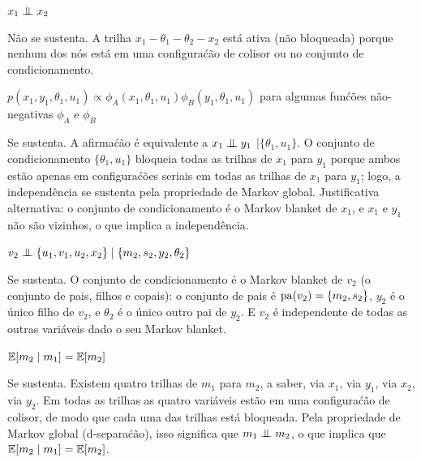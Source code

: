 \begin{exenumerate}
    \item $x_1 \mathrel{\perp\mspace{-10mu}\perp} x_2$
    
    \begin{solution}
        N\~ao se sustenta. A trilha $x_1 - \theta_1 - \theta_2 - x_2$ est\'a
        ativa (n\~ao bloqueada) porque nenhum dos n\'os est\'a em uma configura\'c\~ao
        de colisor ou no conjunto de condicionamento.
    \end{solution}
    
    \item $p(x_1, y_1, \theta_1, u_1) \propto \phi_A(x_1, \theta_1, u_1)\phi_B(y_1, \theta_1, u_1)$ para algumas fun\'c\~oes n\~ao-negativas $\phi_A$ e $\phi_B$ 
    
    \begin{solution}
        Se sustenta. A afirma\'c\~ao \'e equivalente a $x_1 \mathrel{\perp\mspace{-10mu}\perp} y_1$
        $\mid \{\theta_1, u_1\}$. O conjunto de condicionamento $\{\theta_1,
        u_1\}$ bloqueia todas as trilhas de $x_1$ para $y_1$ porque ambos
        est\~ao apenas em configura\'c\~oes seriais em todas as trilhas de $x_1$ para
        $y_1$; logo, a independ\^encia se sustenta pela propriedade de Markov
        global. Justificativa alternativa: o conjunto de condicionamento \'e
        o Markov blanket de $x_1$, e $x_1$ e $y_1$ n\~ao s\~ao
        vizinhos, o que implica a independ\^encia.
    \end{solution}
    
    \item $v_2 \mathrel{\perp\mspace{-10mu}\perp} \{u_1, v_1, u_2, x_2\} \mid \{m_2, s_2, y_2, \theta_2\}$
    
    \begin{solution}
        Se sustenta. O conjunto de condicionamento \'e o Markov blanket de $v_2$
        (o conjunto de pais, filhos e copais): o conjunto de
        pais \'e $\mathrm{pa}(v_2)=\{m_2, s_2\}$, $y_2$ \'e o \'unico filho de
        $v_2$, e $\theta_2$ \'e o \'unico outro pai de
        $y_2$. E $v_2$ \'e independente de todas as outras vari\'aveis
        dado o seu Markov blanket.
    \end{solution}
    
    \item $\mathbb{E} [ m_2 \mid  m_1 ] = \mathbb{E}[m_2]$
    
    \begin{solution}
        Se sustenta. Existem quatro trilhas de $m_1$ para $m_2$, a saber, via
        $x_1$, via $y_1$, via $x_2$, via $y_2$. Em todas as trilhas as quatro
        vari\'aveis est\~ao em uma configura\'c\~ao de colisor, de modo que cada uma das
        trilhas est\'a bloqueada. Pela propriedade de Markov global
        (d-separa\'c\~ao), isso significa que $m_1 \mathrel{\perp\mspace{-10mu}\perp} m_2$, o que
        implica que $\mathbb{E}[m_2 \mid m_1] = \mathbb{E}[m_2]$.
        

\end{solution}
\end{exenumerate}
